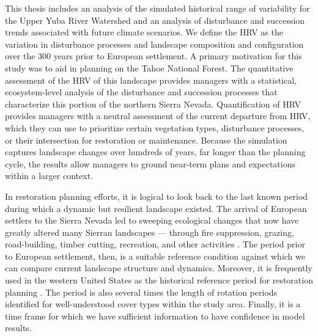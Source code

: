 This thesis includes an analysis of the simulated historical range of variability for the Upper Yuba River Watershed and an analysis of disturbance and succession trends associated with future climate scenarios. We define the HRV as the variation in disturbance processes and landscape composition and configuration over the 300 years prior to European settlement. A primary motivation for this study was to aid in planning on the Tahoe National Forest. The quantitative assessment of the HRV of this landscape provides managers with a statistical, ecosystem-level analysis of the disturbance and succession processes that characterize this portion of the northern Sierra Nevada. Quantification of HRV provides managers with a neutral assessment of the current departure from HRV, which they can use to prioritize certain vegetation types, disturbance processes, or their intersection for restoration or maintenance. Because the simulation captures landscape changes over hundreds of years, far longer than the planning cycle, the results allow managers to ground near-term plans and expectations within a larger context. 

In restoration planning efforts, it is logical to look back to the last known period during which a dynamic but resilient landscape existed. The arrival of European settlers to the Sierra Nevada led to sweeping ecological changes that now have greatly altered many Sierran landscapes --- through fire suppression, grazing, road-building, timber cutting, recreation, and other activities \citep{Storer1963,Stephens2015,Knapp2013,Hessburg2005}. The period prior to European settlement, then, is a suitable reference condition against which we can compare current landscape structure and dynamics. Moreover, it is frequently used in the western United States as the historical reference period for restoration planning \citep{VandeWater2011,Safford2013,Meyer2013}. The period is also several times the length of rotation periods identified for well-understood cover types within the study area. Finally, it is a time frame for which we have sufficient information to have confidence in model results. 

